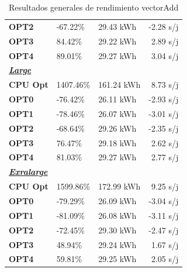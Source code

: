 \begin{table}[H]
\begin{tabular}{lllr}
    \cellcolor[HTML]{DAE8FC} \textbf{OPT2} & -67.22\%  &	29.43 kWh  &	-2.28 s/j \\
    \rowcolor[HTML]{EFEFEF} \cellcolor[HTML]{DAE8FC} \textbf{OPT3} &84.42\%  &	29.22 kWh  &	2.89 s/j \\
    \cellcolor[HTML]{DAE8FC} \textbf{OPT4} & 89.01\%  &	29.27 kWh  &	3.04 s/j \\
    \rowcolor[HTML]{EFEFEF} \cellcolor[HTML]{DAE8FC} \textbf{\textbf{{\emph{{\underline{{Large}}}}}}} &&	&	 \\
    \cellcolor[HTML]{DAE8FC} \textbf{CPU Opt} & 1407.46\%  &	161.24 kWh  &	8.73 s/j \\
    \rowcolor[HTML]{EFEFEF} \cellcolor[HTML]{DAE8FC} \textbf{OPT0} &-76.42\%  &	26.11 kWh  &	-2.93 s/j \\
    \cellcolor[HTML]{DAE8FC} \textbf{OPT1} & -78.46\%  &	26.07 kWh  &	-3.01 s/j \\
    \rowcolor[HTML]{EFEFEF} \cellcolor[HTML]{DAE8FC} \textbf{OPT2} &-68.64\%  &	29.26 kWh  &	-2.35 s/j \\
    \cellcolor[HTML]{DAE8FC} \textbf{OPT3} & 76.47\%  &	29.18 kWh  &	2.62 s/j \\
    \rowcolor[HTML]{EFEFEF} \cellcolor[HTML]{DAE8FC} \textbf{OPT4} &81.03\%  &	29.27 kWh  &	2.77 s/j \\
    \cellcolor[HTML]{DAE8FC} \textbf{\textbf{{\emph{{\underline{{Exralarge}}}}}}} & &	&	 \\
    \rowcolor[HTML]{EFEFEF} \cellcolor[HTML]{DAE8FC} \textbf{CPU Opt} &1599.86\%  &	172.99 kWh  &	9.25 s/j \\
    \cellcolor[HTML]{DAE8FC} \textbf{OPT0} & -79.29\%  &	26.09 kWh  &	-3.04 s/j \\
    \rowcolor[HTML]{EFEFEF} \cellcolor[HTML]{DAE8FC} \textbf{OPT1} &-81.09\%  &	26.08 kWh  &	-3.11 s/j \\
    \cellcolor[HTML]{DAE8FC} \textbf{OPT2} & -72.45\%  &	29.30 kWh  &	-2.47 s/j \\
    \rowcolor[HTML]{EFEFEF} \cellcolor[HTML]{DAE8FC} \textbf{OPT3} &48.94\%  &	29.24 kWh  &	1.67 s/j \\
    \cellcolor[HTML]{DAE8FC} \textbf{OPT4} & 59.81\%  &	29.25 kWh  &	2.05 s/j \\
    \end{tabular}
    \caption[Resultados generales de rendimiento vectorAdd]{{Resultados generales de rendimiento vectorAdd}}
    \label{table_global_vectorAdd_PowerResults_speedup-energy}
\end{table}